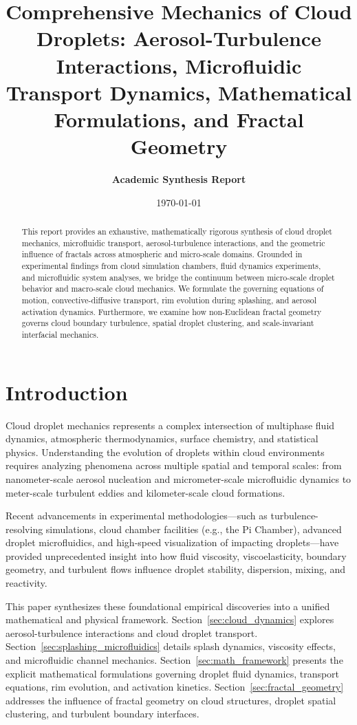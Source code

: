 \documentclass{article}
\title{\textbf{Comprehensive Mechanics of Cloud Droplets: Aerosol-Turbulence Interactions, Microfluidic Transport Dynamics, Mathematical Formulations, and Fractal Geometry}}
\author{\textbf{Academic Synthesis Report}}
\date{\today}
\begin{document}
\maketitle

\begin{abstract}
This report provides an exhaustive, mathematically rigorous synthesis of cloud droplet mechanics, microfluidic transport, aerosol-turbulence interactions, and the geometric influence of fractals across atmospheric and micro-scale domains. Grounded in experimental findings from cloud simulation chambers, fluid dynamics experiments, and microfluidic system analyses, we bridge the continuum between micro-scale droplet behavior and macro-scale cloud mechanics. We formulate the governing equations of motion, convective-diffusive transport, rim evolution during splashing, and aerosol activation dynamics. Furthermore, we examine how non-Euclidean fractal geometry governs cloud boundary turbulence, spatial droplet clustering, and scale-invariant interfacial mechanics.
\end{abstract}

\section{Introduction}
Cloud droplet mechanics represents a complex intersection of multiphase fluid dynamics, atmospheric thermodynamics, surface chemistry, and statistical physics. Understanding the evolution of droplets within cloud environments requires analyzing phenomena across multiple spatial and temporal scales: from nanometer-scale aerosol nucleation and micrometer-scale microfluidic dynamics to meter-scale turbulent eddies and kilometer-scale cloud formations.

Recent advancements in experimental methodologies—such as turbulence-resolving simulations, cloud chamber facilities (e.g., the Pi Chamber), advanced droplet microfluidics, and high-speed visualization of impacting droplets—have provided unprecedented insight into how fluid viscosity, viscoelasticity, boundary geometry, and turbulent flows influence droplet stability, dispersion, mixing, and reactivity. 

This paper synthesizes these foundational empirical discoveries into a unified mathematical and physical framework. Section~\ref{sec:cloud_dynamics} explores aerosol-turbulence interactions and cloud droplet transport. Section~\ref{sec:splashing_microfluidics} details splash dynamics, viscosity effects, and microfluidic channel mechanics. Section~\ref{sec:math_framework} presents the explicit mathematical formulations governing droplet fluid dynamics, transport equations, rim evolution, and activation kinetics. Section~\ref{sec:fractal_geometry} addresses the influence of fractal geometry on cloud structures, droplet spatial clustering, and turbulent boundary interfaces.
\end{document}
